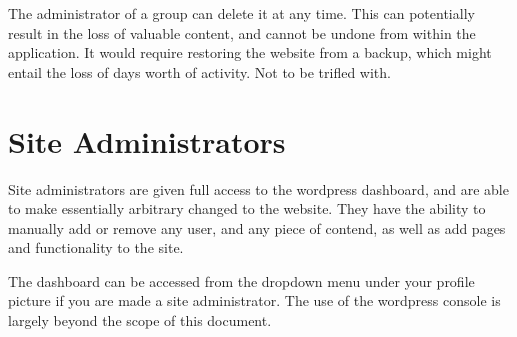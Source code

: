 \documentclass[10pt]{article}
\begin{document}
\begin{flushleft}
The administrator of a group can delete it at any time.  This can potentially result in the loss of valuable content, and cannot be undone from within the application.  It would require restoring the website from a backup, which might entail the loss of days worth of activity.  Not to be trifled with. 
\end{flushleft}

\section{Site Administrators}

\begin{flushleft}
Site administrators are given full access to the wordpress dashboard, and are able to make essentially arbitrary changed to the website.  They have the ability to manually add or remove any user, and any piece of contend, as well as add pages and functionality to the site.
\end{flushleft}

\begin{flushleft}
The dashboard can be accessed from the dropdown menu under your profile picture if you are made a site administrator.  The use of the wordpress console is largely beyond the scope of this document.
\end{flushleft}



\end{document}
